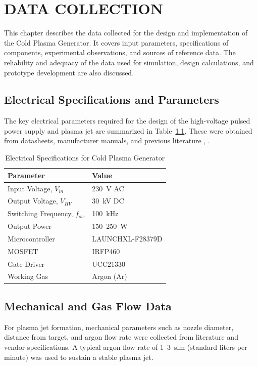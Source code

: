 \chapter{DATA COLLECTION}\label{chap-data}
\thispagestyle{empty}

This chapter describes the data collected for the design and implementation of the Cold Plasma Generator. It covers input parameters, specifications of components, experimental observations, and sources of reference data. The reliability and adequacy of the data used for simulation, design calculations, and prototype development are also discussed.

\section{Electrical Specifications and Parameters}

The key electrical parameters required for the design of the high-voltage pulsed power supply and plasma jet are summarized in Table~\ref{tab-electrical}. These were obtained from datasheets, manufacturer manuals, and previous literature \cite{Diaz2022}, \cite{Spassov1997}.

\begin{table}[h!]\centering
\caption{Electrical Specifications for Cold Plasma Generator}
\label{tab-electrical}
\begin{tabular}{|l|l|}
\hline
Parameter & Value \\ \hline
Input Voltage, $V_{in}$ & 230~V AC \\ \hline
Output Voltage, $V_{HV}$ & 30~kV DC \\ \hline
Switching Frequency, $f_{sw}$ & 100~kHz \\ \hline
Output Power & 150--250~W \\ \hline
Microcontroller & LAUNCHXL-F28379D \\ \hline
MOSFET & IRFP460 \\ \hline
Gate Driver & UCC21330 \\ \hline
Working Gas & Argon (Ar) \\ \hline
\end{tabular}
\end{table}

\section{Mechanical and Gas Flow Data}

For plasma jet formation, mechanical parameters such as nozzle diameter, distance from target, and argon flow rate were collected from literature \cite{Cheng2006} and vendor specifications. A typical argon flow rate of 1–3~slm (standard liters per minute) was used to sustain a stable plasma jet.


